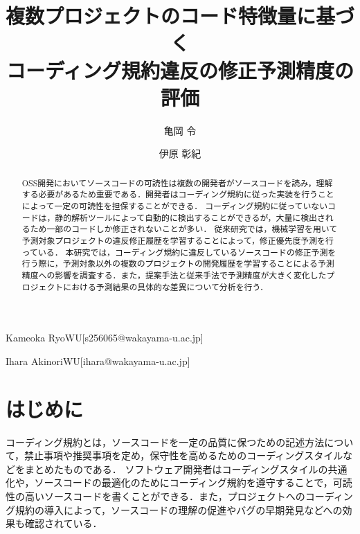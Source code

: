 \documentclass[submit,noauthor,ses,dvipdfmx]{ipsj}
\begin{document}
\title{複数プロジェクトのコード特徴量に基づく\\コーディング規約違反の修正予測精度の評価}




\author{亀岡  令}{Kameoka Ryo}{WU}[s256065@wakayama-u.ac.jp]
\author{伊原  彰紀}{Ihara Akinori}{WU}[ihara@wakayama-u.ac.jp]

\begin{abstract}
OSS開発においてソースコードの可読性は複数の開発者がソースコードを読み，理解する必要があるため重要である．開発者はコーディング規約に従った実装を行うことによって一定の可読性を担保することができる．
コーディング規約に従っていないコードは，静的解析ツールによって自動的に検出することができるが，大量に検出されるため一部のコードしか修正されないことが多い．
従来研究では，機械学習を用いて予測対象プロジェクトの違反修正履歴を学習することによって，修正優先度予測を行っている．
本研究では，コーディング規約に違反しているソースコードの修正予測を行う際に，予測対象以外の複数のプロジェクトの開発履歴を学習することによる予測精度への影響を調査する．また，提案手法と従来手法で予測精度が大きく変化したプロジェクトにおける予測結果の具体的な差異について分析を行う．


\end{abstract}

\maketitle

\section{はじめに}

コーディング規約とは，ソースコードを一定の品質に保つための記述方法について，禁止事項や推奨事項を定め，保守性を高めるためのコーディングスタイルなどをまとめたものである．
ソフトウェア開発者はコーディングスタイルの共通化や，ソースコードの最適化のためにコーディング規約を遵守することで，可読性の高いソースコードを書くことができる\cite{EffectsSAT}．また，プロジェクトへのコーディング規約の導入によって，ソースコードの理解の促進やバグの早期発見などへの効果も確認されている\cite{Beller2}\cite{Johnson}\cite{Beller}．
\end{document}
